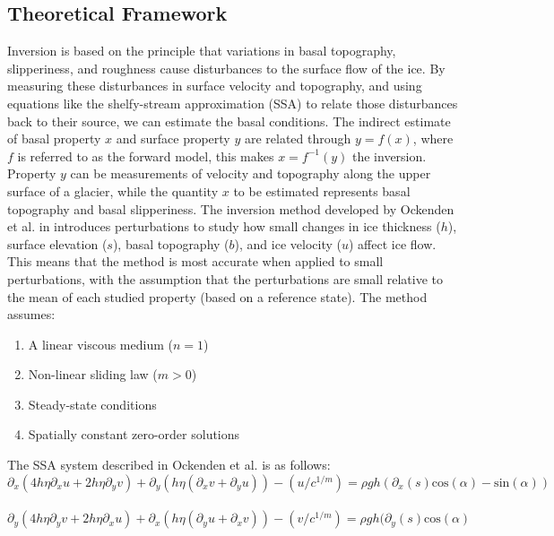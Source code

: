 \subsection*{Theoretical Framework}

Inversion is based on the principle that variations in basal topography, slipperiness, and roughness cause disturbances to the surface flow of the ice. By measuring these disturbances in surface velocity and topography, and using equations like the shelfy-stream approximation (SSA) to relate those disturbances back to their source, we can estimate the basal conditions.
The indirect estimate of basal property $x$ and surface property $y$ are related through $y=f(x)$, where $f$ is referred to as the forward model, this makes  $x=f^{-1}(y)$ the inversion. Property $y$ can be measurements of velocity and topography along the upper surface of a glacier, while the quantity $x$ to be estimated represents basal topography and basal slipperiness\cite{Gudmundsson_2008}.
The inversion method developed by Ockenden et al. in\cite{Ockenden_2022} introduces perturbations to study how small changes in ice thickness ($h$), surface elevation ($s$), basal topography ($b$), and ice velocity ($u$) affect ice flow. This means that the method is most accurate when applied to small perturbations, with the assumption that the perturbations are small relative to the mean of each studied property (based on a reference state). The method assumes:
\begin{enumerate}
\item A linear viscous medium ($n=1$)
\item Non-linear sliding law ($m>0$)
\item Steady-state conditions
\item Spatially constant zero-order solutions
\end{enumerate}

The SSA system described in Ockenden et al.\cite{Ockenden_2022} is as follows:
\begin{equation}\partial_{x} (4 h \eta \partial_{x} u + 2 h \eta \partial_y v) + \partial_{y}(h \eta( \partial_{x} v + \partial_{y} u)) - (u/c^{1/m}) = \rho g h ( \partial_{x} (s) \mathrm{cos}(\alpha) - \mathrm{sin}(\alpha))
\end{equation}\label{eq:2.1}\\
\begin{equation}\partial_{y} (4 h \eta \partial_{y} v + 2 h \eta \partial_x u) + \partial_{x}(h \eta( \partial_{y} u + \partial_{x} v)) - (v/c^{1/m}) = \rho g h ( \partial_{y} (s) \mathrm{cos}(\alpha)
\end{equation}\label{eq:2.2}


